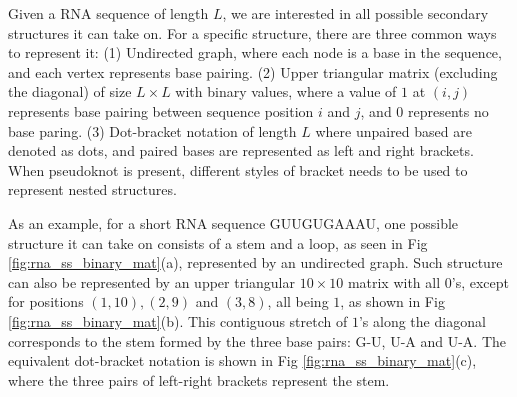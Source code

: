 \documentclass{article}
\begin{document}
Given a RNA sequence of length $L$, we are interested in all possible secondary structures it can take on.
For a specific structure, there are three common ways to represent it:
(1) Undirected graph, where each node is a base in the sequence, and each vertex represents base pairing.
(2) Upper triangular matrix (excluding the diagonal)
of size $L \times L$ with binary values, where a value of $1$ at $(i, j)$ represents
base pairing between sequence position $i$ and $j$, and $0$ represents no base paring.
(3) Dot-bracket notation of length $L$ where unpaired based are denoted as dots,
    and paired bases are represented as left and right brackets.
When pseudoknot is present, different styles of bracket needs to be used to represent nested structures.


%
%
%
%

As an example, for a short RNA sequence GUUGUGAAAU, one possible structure it can take on
consists of a stem and a loop, as seen in Fig \ref{fig:rna_ss_binary_mat}(a), represented by an undirected graph.
Such structure can also be represented by an upper triangular $10 \times 10$ matrix with all $0$'s,
except for positions
$(1, 10), (2, 9)$ and $(3, 8)$,
all being $1$, as shown in Fig \ref{fig:rna_ss_binary_mat}(b).
This contiguous stretch of $1$'s along the diagonal corresponds to the stem formed by the three base pairs: G-U, U-A and U-A.
The equivalent dot-bracket notation is shown in Fig \ref{fig:rna_ss_binary_mat}(c), where the three pairs
of left-right brackets represent the stem.
\end{document}
